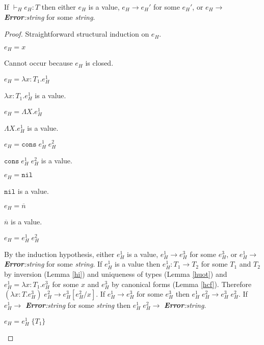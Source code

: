 \begin{hps}
\label{hps}
\onehalfspacing
If $\vdash_{H}e_{H}:T$ then either $e_{H}$ is a value, $e_{H}\rightarrow e_{H}'$ for some $e_{H}'$, or $e_{H}\rightarrow$ \emph{\textbf{Error}:\;string} for some \emph{string}.
\begin{proof}
Straightforward structural induction on $e_{H}$.
\begin{hps-case-1}
$e_{H}=x$

Cannot occur because $e_{H}$ is closed.
\end{hps-case-1}
\begin{hps-case-2}
$e_{H}=\lambda x:T_{1}.e_{H}^{1}$

$\lambda x:T_{1}.e_{H}^{1}$ is a value.
\end{hps-case-2}
\begin{hps-case-3}
$e_{H}=\Lambda X.e_{H}^{1}$

$\Lambda X.e_{H}^{1}$ is a value.
\end{hps-case-3}
\begin{hps-case-4}
$e_{H}=\mathtt{cons}\;e_{H}^{1}\;e_{H}^{2}$

$\mathtt{cons}\;e_{H}^{1}\;e_{H}^{2}$ is a value.
\end{hps-case-4}
\begin{hps-case-5}
$e_{H}=\mathtt{nil}$

$\mathtt{nil}$ is a value.
\end{hps-case-5}
\begin{hps-case-6}
$e_{H}=\overline{n}$

$\overline{n}$ is a value.
\end{hps-case-6}
\begin{hps-case-7}
$e_{H}=e_{H}^{1}\;e_{H}^{2}$

By the induction hypothesis, either $e_{H}^{1}$ is a value, $e_{H}^{1}\rightarrow e_{H}^{3}$ for some $e_{H}^{3}$, or $e_{H}^{1}\rightarrow$ \emph{\textbf{Error}:\;string} for some \emph{string}.  If $e_{H}^{1}$ is a value then $e_{H}^{1}:T_{1}\rightarrow T_{2}$ for some $T_{1}$ and $T_{2}$ by inversion (Lemma \ref{hi}) and uniqueness of types (Lemma \ref{huot}) and $e_{H}^{1}=\lambda x:T_{1}.e_{H}^{3}$ for some $x$ and $e_{H}^{3}$ by canonical forms (Lemma \ref{hcf}).  Therefore $(\lambda x:T.e_{H}^{3})\;e_{H}^{2}\rightarrow e_{H}^{3}[e_{H}^{2}/x]$.  If $e_{H}^{1}\rightarrow e_{H}^{3}$ for some $e_{H}^{3}$ then $e_{H}^{1}\;e_{H}^{2}\rightarrow e_{H}^{3}\;e_{H}^{2}$.  If $e_{H}^{1}\rightarrow$ \emph{\textbf{Error}:\;string} for some \emph{string} then $e_{H}^{1}\;e_{H}^{2}\rightarrow$ \emph{\textbf{Error}:\;string}.
\end{hps-case-7}
\begin{hps-case-8}
$e_{H}=e_{H}^{1}\;\lbrace T_{1}\rbrace$


\end{hps-case-8}
\end{proof}
\end{hps}
